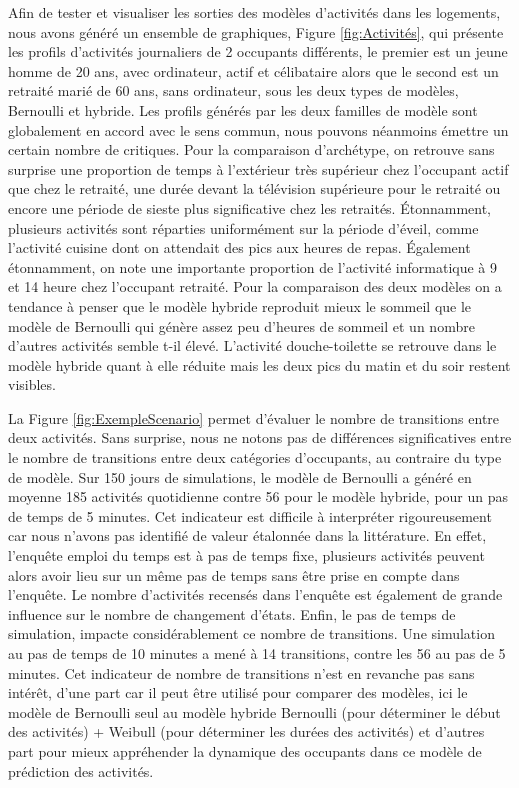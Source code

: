 Afin de tester et visualiser les sorties des modèles d'activités dans les logements, nous avons généré un ensemble de graphiques, Figure \ref{fig:Activités}, qui présente les profils d'activités journaliers de 2 occupants différents, le premier est un jeune homme de 20 ans, avec ordinateur, actif et célibataire alors que le second est un retraité marié de 60 ans, sans ordinateur, sous les deux types de modèles, Bernoulli et hybride. Les profils générés par les deux familles de modèle sont globalement en accord avec le sens commun, nous pouvons néanmoins émettre un certain nombre de critiques. Pour la comparaison d'archétype, on retrouve sans surprise une proportion de temps à l'extérieur très supérieur chez l'occupant actif que chez le retraité, une durée devant la télévision supérieure pour le retraité ou encore une période de sieste plus significative chez les retraités. Étonnamment, plusieurs activités sont réparties uniformément sur la période d'éveil, comme l'activité cuisine dont on attendait des pics aux heures de repas. Également étonnamment, on note une importante proportion de l'activité informatique à 9 et 14 heure chez l'occupant retraité. Pour la comparaison des deux modèles on a tendance à penser que le modèle hybride reproduit mieux le sommeil que le modèle de Bernoulli qui génère assez peu d'heures de sommeil et un nombre d'autres activités semble t-il élevé. L'activité douche-toilette se retrouve dans le modèle hybride quant à elle réduite mais les deux pics du matin et du soir restent visibles.

La Figure \ref{fig:ExempleScenario} permet d'évaluer le nombre de transitions entre deux activités. Sans surprise, nous ne notons pas de différences significatives entre le nombre de transitions entre deux catégories d'occupants, au contraire du type de modèle. Sur 150 jours de simulations, le modèle de Bernoulli a généré en moyenne 185 activités quotidienne contre 56 pour le modèle hybride, pour un pas de temps de 5 minutes. Cet indicateur est difficile à interpréter rigoureusement car nous n'avons pas identifié de valeur étalonnée dans la littérature. En effet, l'enquête emploi du temps est à pas de temps fixe, plusieurs activités peuvent alors avoir lieu sur un même pas de temps sans être prise en compte dans l'enquête. Le nombre d'activités recensés dans l'enquête est également de grande influence sur le nombre de changement d'états. Enfin, le pas de temps de simulation, impacte considérablement ce nombre de transitions. Une simulation au pas de temps de 10 minutes a mené à 14 transitions, contre les 56 au pas de 5 minutes. Cet indicateur de nombre de transitions n'est en revanche pas sans intérêt, d'une part car il peut être utilisé pour comparer des modèles, ici le modèle de Bernoulli seul au modèle hybride Bernoulli (pour déterminer le début des activités) + Weibull (pour déterminer les durées des activités) et d'autres part pour mieux appréhender la dynamique des occupants dans ce modèle de prédiction des activités.

